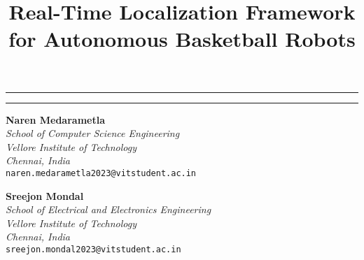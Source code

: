 \documentclass[a4paper]{article}
\title{Real-Time Localization Framework for Autonomous Basketball Robots}
\date{}
\makeatletter
\renewcommand{\maketitle}{
  \begin{center}
    \noindent\rule{\textwidth}{1pt}\par
    \vspace{0.3em}
    {\LARGE \bfseries \@title \par}
    \vspace{0.3em}
    \noindent\rule{\textwidth}{1pt}\par
  \end{center}
}
\makeatother
\begin{document}
\maketitle
\vspace{1cm}


\begin{multicols}{2}
    \centering
    \textbf{Naren Medarametla}\\
    \textit{School of Computer Science Engineering}\\
    \textit{Vellore Institute of Technology}\\
    \textit{Chennai, India}\\
    \texttt{naren.medarametla2023@vitstudent.ac.in}
    \vfill\null

    \columnbreak

    \textbf{Sreejon Mondal}\\
    \textit{School of Electrical and Electronics Engineering}\\
    \textit{Vellore Institute of Technology}\\
    \textit{Chennai, India}\\
    \texttt{sreejon.mondal2023@vitstudent.ac.in}
    \vfill\null
\end{multicols}

\singlespacing
\setlength{\parskip}{6pt}
\setlength{\parindent}{0.5cm}
\end{document}
